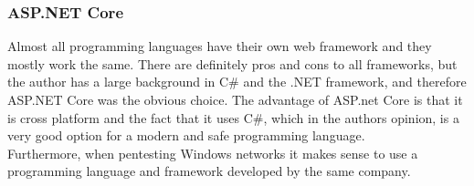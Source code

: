 \documentclass{article}
\begin{document}
\subsubsection{ASP.NET Core}
Almost all programming languages have their own web framework and they mostly work the same. There are definitely pros and cons to all frameworks, but the author has a large background in C\# and the .NET framework, and therefore ASP.NET Core was the obvious choice. The advantage of ASP.net Core is that it is cross platform\cite{url:implementation:aspnet-core} and the fact that it uses C\#, which in the authors opinion, is a very good option for a modern and safe programming language.\\
Furthermore, when pentesting Windows networks it makes sense to use a programming language and framework developed by the same company.
\end{document}
